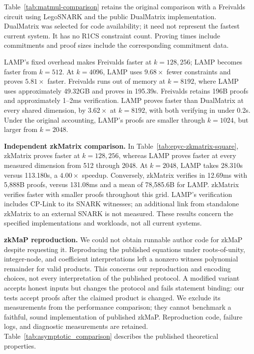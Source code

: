   \begin{revblock}
Table~\ref{tab:matmul-comparison} retains the original comparison with a
Freivalds circuit using LegoSNARK and the public DualMatrix implementation.
DualMatrix was selected for code availability; it need not represent the
fastest current system. It has no R1CS constraint count. Proving times include
commitments and proof sizes include the corresponding commitment data.

LAMP's fixed overhead makes Freivalds faster at \(k=128,256\); LAMP becomes
faster from \(k=512\). At \(k=4096\), LAMP uses \(9.68\times\) fewer constraints
and proves \(5.81\times\) faster. Freivalds runs out of memory at \(k=8192\),
where LAMP uses approximately 49.32GB and proves in 195.39s. Freivalds retains
196B proofs and approximately 1--2ms verification. LAMP proves faster than
DualMatrix at every shared dimension, by \(3.62\times\) at \(k=8192\), with both
verifying in under 0.2s. Under the original accounting, LAMP's proofs are
smaller through \(k=1024\), but larger from \(k=2048\).

\noindent\textbf{Independent zkMatrix comparison.}
In Table~\ref{tab:epyc-zkmatrix-square}, zkMatrix proves faster at
\(k=128,256\), whereas LAMP proves faster at every measured dimension from
512 through 2048. At \(k=2048\), LAMP takes 28.310s versus 113.180s, a
\(4.00\times\) speedup. Conversely, zkMatrix verifies in 12.69ms with 5,888B
proofs, versus 131.08ms and a mean of 78,585.6B for LAMP. zkMatrix verifies
faster with smaller proofs throughout this grid. LAMP's verification includes
CP-Link to its SNARK witnesses; an additional link from standalone zkMatrix
to an external SNARK is not measured. These results concern the specified
implementations and workloads, not all current systems.

\noindent\textbf{zkMaP reproduction.}
We could not obtain runnable author code for zkMaP~\cite{zkMaP} despite
requesting it. Reproducing the published equations under roots-of-unity,
integer-node, and coefficient interpretations left a nonzero witness
polynomial remainder for valid products. This concerns our reproduction and
encoding choices, not every interpretation of the published protocol. A
modified variant accepts honest inputs but changes the protocol and fails
statement binding: our tests accept proofs after the claimed product is
changed. We exclude its measurements from the performance comparison; they
cannot benchmark a faithful, sound implementation of published zkMaP.
Reproduction code, failure logs, and diagnostic measurements are retained.
Table~\ref{tab:asymptotic_comparison} describes the published theoretical
properties.
\end{revblock}

